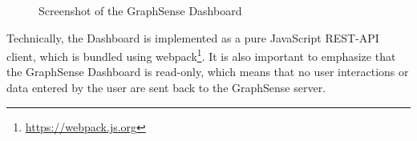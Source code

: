 \begin{figure}
  \caption{Screenshot of the GraphSense Dashboard}
  \label{fig:graphsense_dashboard}
\end{figure}

Technically, the Dashboard is implemented as a pure JavaScript REST-API client, which is bundled using webpack\footnote{\url{https://webpack.js.org}}. It is also important to emphasize that the GraphSense Dashboard is read-only, which means that no user interactions or data entered by the user are sent back to the GraphSense server.
